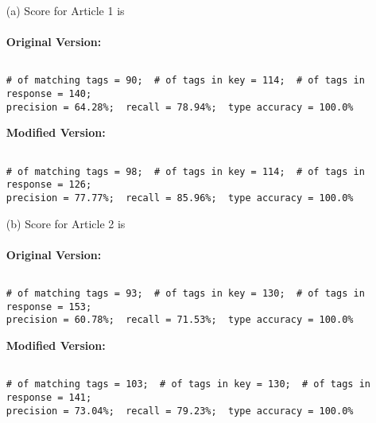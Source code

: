 \documentclass[ruled]{article}
\begin{document}
\begin{itemize}
\item[(a)]
Score for Article 1 is\\ \\
\textbf{Original Version:}
\begin{verbatim}

# of matching tags = 90;  # of tags in key = 114;  # of tags in response = 140;
precision = 64.28%;  recall = 78.94%;  type accuracy = 100.0%

\end{verbatim}

\textbf{Modified Version:} 
\begin{verbatim}

# of matching tags = 98;  # of tags in key = 114;  # of tags in response = 126;
precision = 77.77%;  recall = 85.96%;  type accuracy = 100.0%

\end{verbatim}
\item[(b)]
Score for Article 2 is\\ \\
\textbf{Original Version:}
\begin{verbatim}

# of matching tags = 93;  # of tags in key = 130;  # of tags in response = 153;
precision = 60.78%;  recall = 71.53%;  type accuracy = 100.0%

\end{verbatim}

\textbf{Modified Version:} 
\begin{verbatim}

# of matching tags = 103;  # of tags in key = 130;  # of tags in response = 141;
precision = 73.04%;  recall = 79.23%;  type accuracy = 100.0%

\end{verbatim}

\end{itemize}
\end{document}
